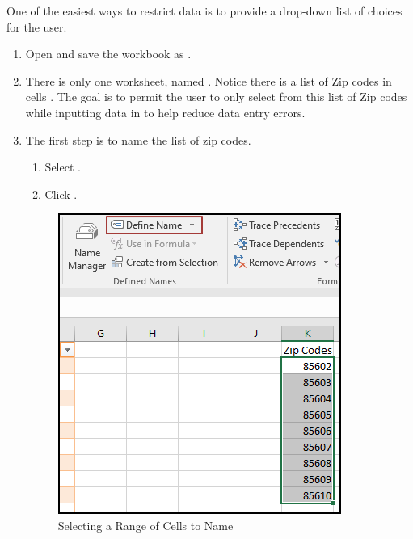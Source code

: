 One of the easiest ways to restrict data is to provide a drop-down list of choices for the user. 

\begin{enumerate}
	\item Open 	and save the workbook as .
	\item There is only one worksheet, named . Notice there is a list of Zip codes in cells . The goal is to permit the user to only select from this list of Zip codes while inputting data in  to help reduce data entry errors.
	\item The first step is to name the list of zip codes.
	
	\begin{enumerate}
		\item Select .
		\item Click .
	\end{enumerate}
	
	\begin{figure}[H]
		\centering
		\includegraphics[width=\maxwidth{.75\linewidth}]{gfx/ch07_fig33}
		\caption{Selecting a Range of Cells to Name}
		\label{07:fig33}
	\end{figure}
	

\end{enumerate}
